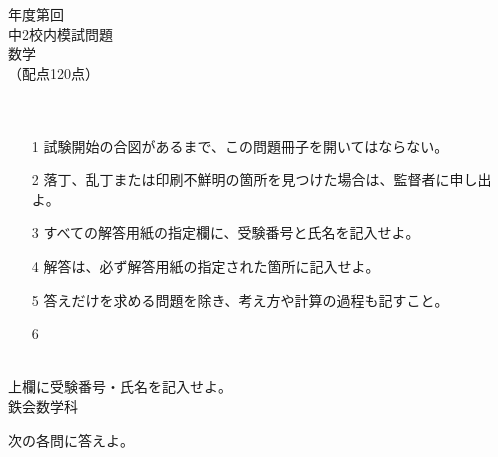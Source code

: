 \documentclass[paper=b5,fontsize=10pt]{jlreq}
\begin{document}
\begin{titlepage}
  \begin{center}
    {\Huge
       年度\hspace{\zw}第 回\\[.3\baselineskip]
      中2校内模試問題\\[.3\baselineskip]
      数学
    }\\[.3\baselineskip]
    {\Large
      （配点120点）\\[\baselineskip]
      \mbox{}
    }\\[\baselineskip]
    {\Large{}}\\[\baselineskip]
    \begin{itemize}[itemsep=.3\baselineskip,labelsep=\zw,itemindent=\zw,leftmargin=0\zw]
      \item[1] 試験開始の合図があるまで、この問題冊子を開いてはならない。
      \item[2] 落丁、乱丁または印刷不鮮明の箇所を見つけた場合は、監督者に申し出よ。
      \item[3] すべての解答用紙の指定欄に、受験番号と氏名を記入せよ。
      \item[4] 解答は、必ず解答用紙の指定された箇所に記入せよ。
      \item[5] 答えだけを求める問題を除き、考え方や計算の過程も記すこと。
      \item[6] 
    \end{itemize}
    \vspace{\baselineskip}
    \\[.3\baselineskip]
    上欄に受験番号・氏名を記入せよ。\\[\baselineskip]
    {\Huge 鉄会\hspace{\zw}数学科}
  \end{center}
\end{titlepage}


次の各問に答えよ。
\end{document}
